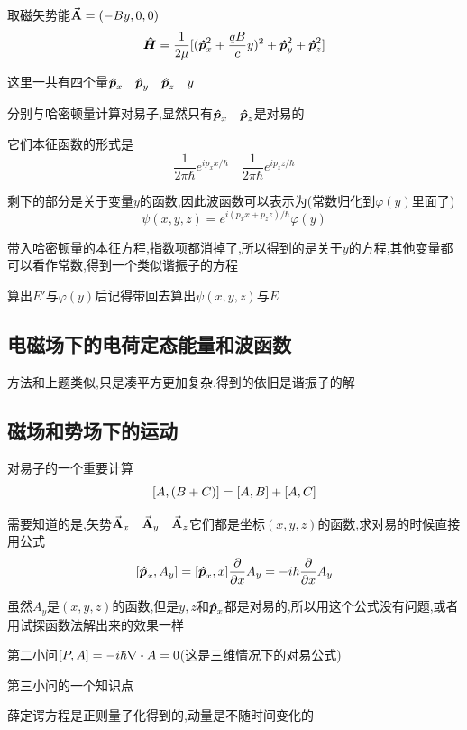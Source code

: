             取磁矢势能$\va{A} = (-By,0,0)$
            $$ \vu*{H} = \frac{1}{2\mu} [(\vu*{p}_{x}^{2} + \frac{qB}{c} y)^{2} + \vu*{p}_{y}^{2} + \vu*{p}_{z}^{2} ] $$

            这里一共有四个量$\vu*{p}_{x} \quad \vu*{p}_{y} \quad \vu*{p}_{z} \quad y $

            分别与哈密顿量计算对易子,显然只有$\vu*{p}_{x} \quad \vu*{p}_{z}$是对易的

            它们本征函数的形式是
            $$ \frac{1}{2\pi \hbar} e^{ip_{x}x/\hbar} \quad \frac{1}{2\pi \hbar} e^{ip_{z}z / \hbar} $$

            剩下的部分是关于变量$y$的函数,因此波函数可以表示为(常数归化到$\varphi(y)$里面了)
            $$ \psi(x,y,z) = e^{i(p_{x}x+p_{z}z)/\hbar} \varphi(y) $$

            带入哈密顿量的本征方程,指数项都消掉了,所以得到的是关于$y$的方程,其他变量都可以看作常数,得到一个类似谐振子的方程
            
            算出$E'$与$\varphi(y)$后记得带回去算出$\psi(x,y,z)$与$E$


        \subsection{电磁场下的电荷定态能量和波函数}
            方法和上题类似,只是凑平方更加复杂.得到的依旧是谐振子的解

        \subsection{磁场和势场下的运动}
            \begin{formal}
                对易子的一个重要计算
                    $$ \comm{A}{(B+C)} = \comm{A}{B} + \comm{A}{C} $$
            \end{formal}
        
            需要知道的是,矢势$\va{A}_{x} \quad \va{A}_{y} \quad \va{A}_{z}$它们都是坐标$(x,y,z)$的函数,求对易的时候直接用公式
            $$ \comm{\vu*{p}_{x}}{A_{y}}  =  \comm{\vu*{p}_{x}}{x} \pdv{x} A_{y} =  - i \hbar \pdv{x} A_{y} $$

            虽然$A_{y}$是$(x,y,z)$的函数,但是$y,z$和$\vu*{p}_{x}$都是对易的,所以用这个公式没有问题,或者用试探函数法解出来的效果一样

            第二小问$\comm{P}{A} = -i\hbar \nabla \vdot A = 0$(这是三维情况下的对易公式)

            第三小问的一个知识点

            \begin{formal}
                薛定谔方程是正则量子化得到的,动量是不随时间变化的
            \end{formal}

